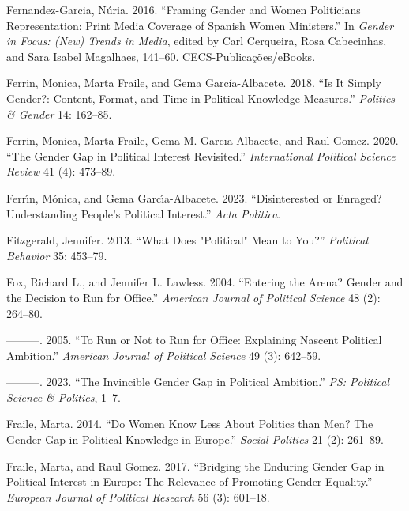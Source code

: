 \documentclass[
  letterpaper,
  DIV=11,
  numbers=noendperiod]{scrreprt}
\newlength{\cslhangindent}
\newlength{\cslentryspacingunit} %
\newenvironment{CSLReferences}[2] %
 {%
  \setlength{\parindent}{0pt}
  \ifodd #1
  \let\oldpar\par
  \def\par{\hangindent=\cslhangindent\oldpar}
  \fi
  \setlength{\parskip}{#2\cslentryspacingunit}
 }%
 {}
\begin{document}
\begin{CSLReferences}{1}{0}
\leavevmode{}%
Fernandez-Garcia, Núria. 2016. {``{Framing Gender and Women Politicians
Representation: Print Media Coverage of Spanish Women Ministers}.''} In
\emph{{Gender in Focus: (New) Trends in Media}}, edited by Carl
Cerqueira, Rosa Cabecinhas, and Sara Isabel Magalhaes, 141--60.
CECS-Publica{ç}{õ}es/eBooks.

\leavevmode{}%
Ferrin, Monica, Marta Fraile, and Gema García-Albacete. 2018. {``{Is It
Simply Gender?: Content, Format, and Time in Political Knowledge
Measures}.''} \emph{Politics \& Gender} 14: 162--85.

\leavevmode{}%
Ferrin, Monica, Marta Fraile, Gema M. Garcıa-Albacete, and Raul Gomez.
2020. {``{The Gender Gap in Political Interest Revisited}.''}
\emph{International Political Science Review} 41 (4): 473--89.

\leavevmode{}%
Ferrı́n, Mónica, and Gema Garcı́a-Albacete. 2023. {``{Disinterested or
Enraged? Understanding People's Political Interest}.''} \emph{Acta
Politica}.

\leavevmode{}%
Fitzgerald, Jennifer. 2013. {``{What Does "Political" Mean to You?}''}
\emph{Political Behavior} 35: 453--79.

\leavevmode{}%
Fox, Richard L., and Jennifer L. Lawless. 2004. {``{Entering the Arena?
Gender and the Decision to Run for Office}.''} \emph{American Journal of
Political Science} 48 (2): 264--80.

\leavevmode{}%
---------. 2005. {``{To Run or Not to Run for Office: Explaining Nascent
Political Ambition}.''} \emph{American Journal of Political Science} 49
(3): 642--59.

\leavevmode{}%
---------. 2023. {``{The Invincible Gender Gap in Political
Ambition}.''} \emph{PS: Political Science \& Politics}, 1--7.

\leavevmode{}%
Fraile, Marta. 2014. {``{Do Women Know Less About Politics than Men? The
Gender Gap in Political Knowledge in Europe}.''} \emph{Social Politics}
21 (2): 261--89.

\leavevmode{}%
Fraile, Marta, and Raul Gomez. 2017. {``{Bridging the Enduring Gender
Gap in Political Interest in Europe: The Relevance of Promoting Gender
Equality}.''} \emph{European Journal of Political Research} 56 (3):
601--18.


\end{CSLReferences}
\end{document}
